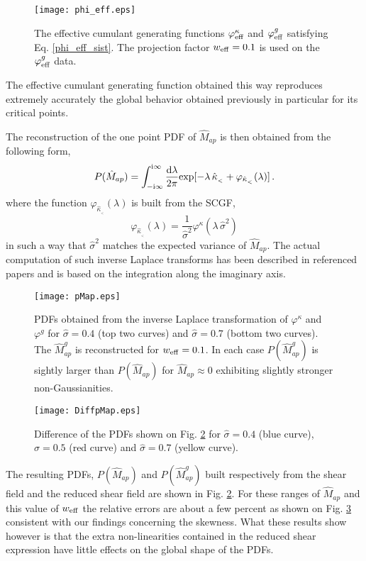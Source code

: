 \documentclass[twocolumn,aps,reprint, nofootinbib]{revtex4}
\newcommand{\ii}{{\mathrm{i}}}
\newcommand{\dd}{{\rm d}}
\newcommand{\eff}{{\rm eff}}
\newcommand{\w}{{w_{\eff}}}
\newcommand{\hkappa}{\hat{\kappa}_{_<}}
\newcommand{\hsigma}{\hat{\sigma}}
\newcommand{\Map}{\hat{M}_{ap}}
\newcommand{\Mapg}{\hat{M}_{ap}^g}
\newcommand{\varphik}{\varphi^{\kappa}}
\newcommand{\varphir}{\varphi^{g}}
\begin{document}
\begin{figure}[!ht]
\centering
\texttt{[image: phi\_eff.eps]}
\caption{The effective cumulant generating functions $\varphik_{\eff}$ and $\varphir_{\eff}$ satisfying Eq. \eqref{phi_eff_sist}. The projection factor $\w=0.1$ is used on the $\varphir_{\eff}$ data.}
\label{phi_eff}
\end{figure}
The effective cumulant generating function obtained this way reproduces extremely accurately the global behavior obtained previously
in particular for its critical points. 

The reconstruction of the one point PDF of $\Map$ is then obtained from the following form,
\begin{equation}
P(\Map) = \int_{- \ii \infty}^{\ii \infty} \frac{\dd \lambda}{2 \pi} \mathrm{exp}[-\lambda \, \hkappa + \varphi_{\hkappa} (\lambda)] \, .
\end{equation}
where the function $\varphi_{\hkappa} ( \lambda)$ is built from the SCGF, 
\begin{equation}
\varphi_{\hkappa} ( \lambda) = \frac{1}{\hsigma^2} \varphik (\lambda \, \hsigma^2)
\end{equation}
in such a way that $\hsigma^2$ matches the expected variance of $\Map$. The actual computation of such inverse Laplace transforms has been described in referenced papers and is based on the integration along the imaginary axis.


\begin{figure}[!ht]
\centering
\texttt{[image: pMap.eps]}
\caption{PDFs obtained from the inverse Laplace transformation of $\varphik$ and $\varphir$ for $\hsigma=0.4$ (top two curves) and $\hsigma=0.7$ (bottom two curves). The $\Mapg$ is reconstructed for $\w=0.1$. In each case $P(\Map^{g})$ is  sightly larger than $P(\Map)$ for $\Map\approx 0$ exhibiting slightly stronger non-Gaussianities.}
\label{pMap}
\end{figure}

\begin{figure}[!ht]
\centering
\texttt{[image: DiffpMap.eps]}
\caption{Difference of the PDFs shown on Fig. \ref{pMap} for  $\hsigma=0.4$ (blue curve), $\hsigma=0.5$ (red curve) and $\hsigma=0.7$ (yellow curve).}
\label{DiffpMap}
\end{figure}

The resulting PDFs, $P(\Map)$ and $P(\Map^{g})$ built respectively from the shear field and the reduced shear field are shown in Fig. \ref{pMap}. For these ranges of $\Map$ and this value of $\w$ the relative errors are about a few percent as shown on Fig. \ref{DiffpMap}
consistent with our findings concerning the skewness. What these results show however is that the extra non-linearities contained in the reduced shear expression have little effects on the global shape of the PDFs.  
\end{document}
